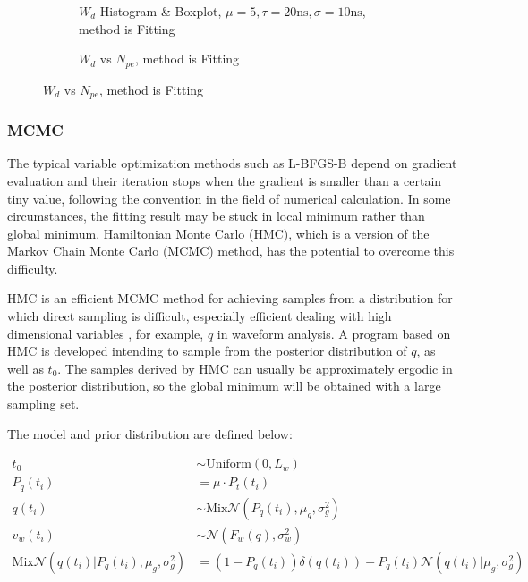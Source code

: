 \begin{figure}[H]
\begin{minipage}[t]{.5\textwidth}
\begin{figure}[H]
    \centering
    \resizebox{\textwidth}{!}{}
    \caption{\label{fig:fitting-hist} $W_{d}$ Histogram \& Boxplot, $\mu=5, \tau=20\mathrm{ns}, \sigma=10\mathrm{ns}$, method is Fitting}
\end{figure}
\end{minipage}
\begin{minipage}[t]{.5\textwidth}
\begin{figure}[H]
    \centering
    \resizebox{\textwidth}{!}{}
    \caption{\label{fig:fitting-npe} $W_{d}$ vs $N_{pe}$, method is Fitting}
\end{figure}
\end{minipage}
\end{figure}

\subsubsection{MCMC}

The typical variable optimization methods such as L-BFGS-B depend on gradient evaluation and their iteration stops when the gradient is smaller than a certain tiny value, following the convention in the field of numerical calculation. In some circumstances, the fitting result may be stuck in local minimum rather than global minimum. Hamiltonian Monte Carlo (HMC), which is a version of the Markov Chain Monte Carlo (MCMC) method, has the potential to overcome this difficulty. 

HMC is an efficient MCMC method for achieving samples from a distribution for which direct sampling is difficult, especially efficient dealing with high dimensional variables \cite{neal_mcmc_2012}, for example, $q$ in waveform analysis. A program based on HMC is developed intending to sample from the posterior distribution of $q$, as well as $t_{0}$. The samples derived by HMC can usually be approximately ergodic in the posterior distribution, so the global minimum will be obtained with a large sampling set. 

The model and prior distribution are defined below: 

\begin{align}
    t_{0} &\sim \mathrm{Uniform}(0, L_{w}) \\
    P_{q}(t_{i}) &= \mu \cdot P_{t}(t_{i}) \\
    q(t_{i}) &\sim \mathrm{Mix}\mathcal{N}(P_{q}(t_{i}), \mu_{g}, \sigma_{g}^{2}) \\
    v_{w}(t_{i}) &\sim \mathcal{N}(F_{w}(q), \sigma_{w}^{2}) \\
    \mathrm{Mix}\mathcal{N}(q(t_{i}) | P_{q}(t_{i}), \mu_{g}, \sigma_{g}^{2}) &= (1 - P_{q}(t_{i}))\delta(q(t_{i})) + P_{q}(t_{i})\mathcal{N}(q(t_{i}) | \mu_{g}, \sigma_{g}^{2}) \label{eq:mixnormal}
\end{align}

